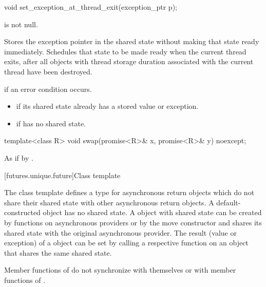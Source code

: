 %
\begin{itemdecl}
void set_exception_at_thread_exit(exception_ptr p);
\end{itemdecl}

\begin{itemdescr}
\pnum
\expects
{} is not null.

\pnum
\effects
Stores the exception pointer  in the shared state without
making that state ready immediately. Schedules that state to be made ready when
the current thread exits, after all objects with thread storage duration
associated with the current thread have been destroyed.

\pnum
\throws
{} if an error condition occurs.

\pnum
\errors
\begin{itemize}
\item {} if its shared state
already has a stored value or exception.
\item {} if  has no shared state.
\end{itemize}
\end{itemdescr}

%
\begin{itemdecl}
template<class R>
  void swap(promise<R>& x, promise<R>& y) noexcept;
\end{itemdecl}

\begin{itemdescr}
\pnum
\effects
As if by .
\end{itemdescr}

[futures.unique.future]{Class template }

\pnum
The class template  defines a type for asynchronous return objects which
do not share their shared state with other asynchronous return objects.
A default-constructed  object has no
shared state. A  object with shared state can be created by
functions on asynchronous providers or by the move constructor
and shares its shared state with
the original asynchronous provider. The result (value or exception) of
a  object
can be
set by
calling a respective function on an
object that shares the same
shared state.

\pnum
\begin{note}
Member functions of  do not synchronize with themselves or with
member functions of .
\end{note}

